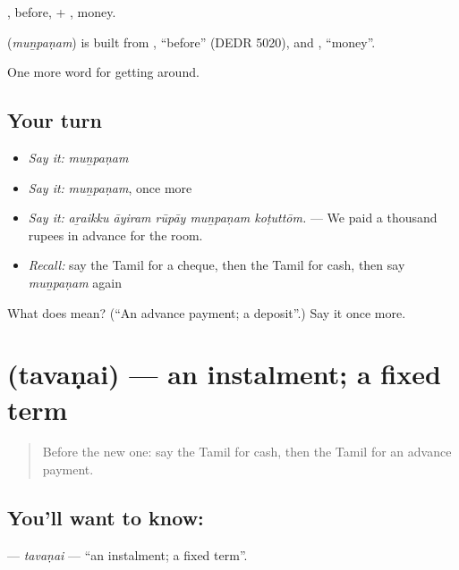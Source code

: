 , before, + , money.

\begin{cousinweb}
\textbf{} (\emph{muṉpaṇam}) is built from , \textquotedblleft{}before\textquotedblright{} (DEDR 5020), and , \textquotedblleft{}money\textquotedblright{}.
\end{cousinweb}

\begin{grammarlens}[title={What you've built}]
One more word for getting around.
\end{grammarlens}

\subsection*{Your turn}
\begin{itemize}
\raggedright
  \item \emph{Say it:} \emph{muṉpaṇam}
  \item \emph{Say it:} \emph{muṉpaṇam}, once more
  \item \emph{Say it:} \emph{aṟaikku āyiram rūpāy muṉpaṇam koṭuttōm.} — We paid a thousand rupees in advance for the room.
  \item \emph{Recall:} say the Tamil for a cheque, then the Tamil for cash, then say \emph{muṉpaṇam} again
\end{itemize}

\begin{tcolorbox}[breakable,colback=teal!4,colframe=teal!35!black,title={Before you move on}]
What does  mean? (\textquotedblleft{}An advance payment; a deposit\textquotedblright{}.) Say it once more.
\end{tcolorbox}
\section[\texorpdfstring{\ta{தவணை} (tavaṇai)}{தவணை (tavaṇai)}]{ (tavaṇai) — an instalment; a fixed term}

\label{lesson:TA-C447-tavanai}



\begin{quote}
Before the new one: say the Tamil for cash, then the Tamil for an advance payment.
\end{quote}

\subsection*{You'll want to know: }
\textbf{} — \emph{tavaṇai} — \textquotedblleft{}an instalment; a fixed term\textquotedblright{}.

